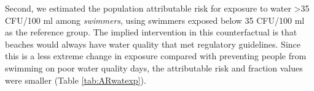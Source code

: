 \documentclass[12pt]{article}\usepackage[]{graphicx}\usepackage[]{color}
\begin{document}
Second, we estimated the population attributable risk for exposure to water >35 CFU/100 ml among \textit{swimmers}, using swimmers exposed below 35 CFU/100 ml as the reference group. The implied intervention in this counterfactual is that beaches would always have water quality that met regulatory guidelines.  Since this is a less extreme change in exposure compared with preventing people from swimming on poor water quality days, the attributable risk and fraction values were smaller (Table \ref{tab:ARwatexp}). 

\end{document}
